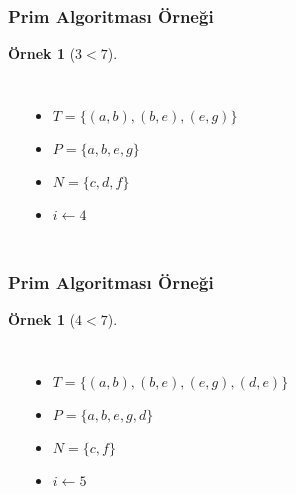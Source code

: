 \documentclass[dvipsnames]{beamer}
\theoremstyle{definition}
\theoremstyle{example}
\newtheorem{ornek}[theorem]{Örnek}
\theoremstyle{plain}
\begin{document}
\begin{frame}
  \frametitle{Prim Algoritması Örneği}

  \begin{ornek}[$3 < 7$]
    \begin{columns}
      \begin{center}
      \end{center}

      \pause
      \begin{itemize}
        \item $T = \{ (a,b), (b,e), (e,g) \}$
        \item $P = \{ a, b, e, g \}$
        \item $N = \{ c, d, f \}$
        \item $i \leftarrow 4$
      \end{itemize}
    \end{columns}
  \end{ornek}
\end{frame}

\begin{frame}
  \frametitle{Prim Algoritması Örneği}

  \begin{ornek}[$4 < 7$]
    \begin{columns}
      \begin{center}
      \end{center}

      \pause
      \begin{itemize}
        \item $T = \{ (a,b), (b,e), (e,g), (d,e) \}$
        \item $P = \{ a, b, e, g, d \}$
        \item $N = \{ c, f \}$
        \item $i \leftarrow 5$
      \end{itemize}
    \end{columns}
  \end{ornek}
\end{frame}
\end{document}
